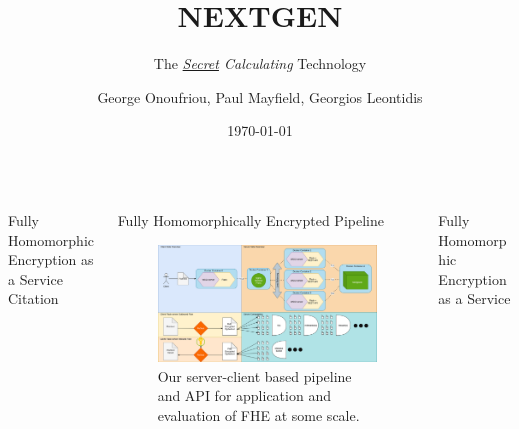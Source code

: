 \documentclass{beamer}
\title[NEXTGEN]{NEXTGEN}
\subtitle{The \textit{\href{https://cryptolog.io}{Secret} Calculating} Technology}
\author[\href{https://nextgen.abdn.ac.uk}{nextgen.abdn.ac.uk} or \href{https://cryptolog.io}{cryptolog.io}]{George Onoufriou, Paul Mayfield, Georgios Leontidis}
\date{\today}
\begin{document}
  \begin{frame}
    \maketitle
    \begin{columns}
      \begin{column}{0.3\textwidth}
        \begin{block}{Fully Homomorphic Encryption as a Service}
          Citation \autocite{gentry2009fully, Goodfellow-et-al-2016}
        \end{block}
      \end{column}
      \begin{column}{0.3\textwidth}
        \begin{block}{Fully Homomorphically Encrypted Pipeline}
          \begin{figure}
            \centering
            \includegraphics[width=\textwidth]{nextgen.png}
            \caption{Our server-client based pipeline and API for application and evaluation of FHE at some scale.}
            \label{fig:gan}
          \end{figure}
        \end{block}
      \end{column}
      \begin{column}{0.3\textwidth}
        \begin{block}{Fully Homomorphic Encryption as a Service}
        \end{block}
      \end{column}
    \end{columns}


\end{frame}
\end{document}
